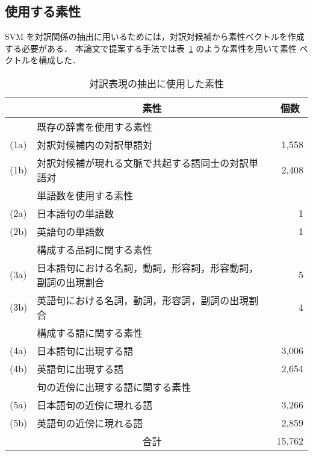 \subsection{使用する素性}
\label{sec:feature}

SVM を対訳関係の抽出に用いるためには，対訳対候補から素性ベクトルを作成
する必要がある．
本論文で提案する手法では表~\ref{tab:features} のような素性を用いて素性
ベクトルを構成した．

\begin{table}[t]
  \centering
  \caption{対訳表現の抽出に使用した素性}
  \label{tab:features}
  \begin{small}
    \begin{tabular}{|ll|r|}
      \hline
      & \multicolumn{1}{c|}{素性} & \multicolumn{1}{c|}{個数} \\
      \hline\hline

      & 既存の辞書を使用する素性 &  \\ \hline
      (1a) & 対訳対候補内の対訳単語対 & 1,558 \\
      (1b) & 対訳対候補が現れる文脈で共起する語同士の対訳単語対 & 2,408 \\
      \hline

      & 単語数を使用する素性 & \\ \hline
      (2a) & 日本語句の単語数 & 1\\
      (2b) & 英語句の単語数 & 1\\
      \hline

      & 構成する品詞に関する素性 & \\ \hline
      (3a) & 日本語句における名詞，動詞，形容詞，形容動詞，副詞の出現割合 & 5\\
      (3b) & 英語句における名詞，動詞，形容詞，副詞の出現割合 & 4\\
      \hline

      & 構成する語に関する素性 & \\ \hline
      (4a) & 日本語句に出現する語 & 3,006 \\
      (4b) & 英語句に出現する語 & 2,654 \\
      \hline

      & 句の近傍に出現する語に関する素性 & \\ \hline
      (5a) & 日本語句の近傍に現れる語 & 3,266 \\
      (5b) & 英語句の近傍に現れる語 & 2,859 \\
      \hline\hline

      
      & \multicolumn{1}{c|}{合計} & 15,762\\
      \hline
    \end{tabular}
  \end{small}
\end{table}

